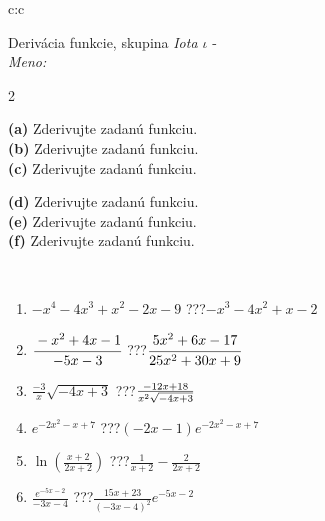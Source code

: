 \documentclass[10pt]{report}
\begin{document}
\newpage
\thispagestyle{empty}
\begin{tabular}{c:c}
\begin{minipage}[c][104.5mm][t]{0.5\linewidth}
\begin{center}
\vspace{7mm}
{\huge Derivácia funkcie, skupina \textit{Iota $\iota$} -}\\[5mm]
\textit{Meno:}\phantom{xxxxxxxxxxxxxxxxxxxxxxxxxxxxxxxxxxxxxxxxxxxxxxxxxxxxxxxxxxxxxxxxx}\\[5mm]
\begin{minipage}{0.95\linewidth}
\begin{center}
{\small \begin{multicols}{2} \raggedright
\textbf{(a)} Zderivujte zadanú funkciu. \\[1mm]
\textbf{(b)} Zderivujte zadanú funkciu. \\[1mm]
\textbf{(c)} Zderivujte zadanú funkciu. \par \columnbreak
\textbf{(d)} Zderivujte zadanú funkciu. \\[1mm]
\textbf{(e)} Zderivujte zadanú funkciu. \\[1mm]
\textbf{(f)} Zderivujte zadanú funkciu.
\end{multicols}
}
\end{center}
\end{minipage}
\\[4mm]
\begin{minipage}{0.79\linewidth}
\begin{center}
\begin{varwidth}{\linewidth}
\begin{enumerate}
\normalsize
\item $-x^4-4x^3+x^2-2x-9$\quad \dotfill\; ???\;\dotfill \quad $-x^3-4x^2+x-2$
\item $\cfrac{-x^2+4x-1}{-5x-3}$\quad \dotfill\; ???\;\dotfill \quad $\cfrac{5x^2+6x-17}{25x^2+30x+9}$
\item $\frac{-3}{x}\sqrt{-4x+3}$\quad \dotfill\; ???\;\dotfill \quad $\frac{-12x+18}{x^2 \sqrt{\smash[b]{-4x+3}}}$
\item $e^{-2x^2-x+7}$\quad \dotfill\; ???\;\dotfill \quad $(-2x-1)e^{-2x^2-x+7}$
\item $\ln{\left(\frac{x+2}{2x+2}\right)}$\quad \dotfill\; ???\;\dotfill \quad $\frac{1}{x+2}-\frac{2}{2x+2}$
\item $\frac{e^{-5x-2}}{-3x-4}$\quad \dotfill\; ???\;\dotfill \quad $\frac{15x+23}{(-3x-4)^2}e^{-5x-2}$
\end{enumerate}

\end{varwidth}
\end{center}
\end{minipage}
\end{center}
\end{minipage}
\end{tabular}
\end{document}
